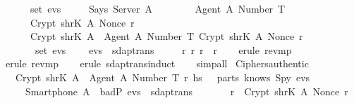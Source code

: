 \begin{isabellebody}
  \ \ \ \ {\isasymrbrace}\ {\isasymin}\ set\ evs\ {\isacharsemicolon}\isanewline
  \ \ \ \ Says\ Server\ A\ {\isasymlbrace}\ \isanewline
  \ \ \ \ \ \ {\isasymlbrace}Agent\ A{\isacharcomma}\ Number\ T{\isasymrbrace}{\isacharcomma}\isanewline
  \ \ \ \ \ \ Crypt\ {\isacharparenleft}shrK\ A{\isacharparenright}\ {\isacharparenleft}Nonce\ r{\isacharprime}{\isacharparenright}{\isacharcomma}\isanewline
  \ \ \ \ \ \ Crypt\ {\isacharparenleft}shrK\ A{\isacharparenright}\ {\isasymlbrace}\ {\isasymlbrace}Agent\ A{\isacharcomma}\ Number\ T{\isasymrbrace}{\isacharcomma}\ Crypt\ {\isacharparenleft}shrK\ A{\isacharparenright}\ {\isacharparenleft}Nonce\ r{\isacharprime}{\isacharparenright}\ {\isasymrbrace}\isanewline
  \ \ \ \ \ {\isasymrbrace}\ {\isasymin}\ set\ evs{\isacharsemicolon}\isanewline
  \ \ \ \ evs\ {\isasymin}\ sdaptrans{\isasymrbrakk}\isanewline
  \ \ \ {\isasymLongrightarrow}\ {\isasymexists}\ r\ r{\isacharprime}{\isachardot}\ {\isacharparenleft}r\ {\isacharequal}\ r{\isacharprime}{\isacharparenright}{\isachardoublequoteclose}\isanewline
  \isadelimproof
  \isanewline
  \ \ %
  \endisadelimproof
  \isatagproof
  \isamarkupfalse%
  \ {\isacharparenleft}erule\ rev{\isacharunderscore}mp{\isacharparenright}\isanewline
  \ \ \isamarkupfalse%
  \ {\isacharparenleft}erule\ rev{\isacharunderscore}mp{\isacharparenright}\isanewline
  \ \ \isamarkupfalse%
  \ {\isacharparenleft}erule\ sdaptrans{\isachardot}induct{\isacharparenright}\isanewline
  \ \ \isamarkupfalse%
  \ {\isacharparenleft}simp{\isacharunderscore}all{\isacharparenright}\isanewline
  \isamarkupfalse%
  \endisatagproof
  {\isafoldproof}%
  \isadelimproof
  \isanewline
  \endisadelimproof
  \isanewline
  \isanewline
  \isamarkupfalse%
  \ Ciphers{\isacharunderscore}authentic\ {\isacharcolon}\isanewline
  \ \ {\isachardoublequoteopen}{\isasymlbrakk}\ Crypt\ {\isacharparenleft}shrK\ A{\isacharparenright}\ {\isasymlbrace}\ {\isasymlbrace}Agent\ A{\isacharcomma}\ Number\ T{\isasymrbrace}{\isacharcomma}\ r{\isacharprime}{\isacharcomma}\ h\isactrlsub s\ {\isasymrbrace}\ {\isasymin}\ parts\ {\isacharparenleft}knows\ Spy\ evs{\isacharparenright}{\isacharsemicolon}\isanewline
  \ \ \ \ \ {\isacharparenleft}Smartphone\ A{\isacharparenright}\ {\isasymnotin}\ badP{\isacharsemicolon}\ evs\ {\isasymin}\ sdaptrans\ {\isasymrbrakk}\isanewline
  \ \ \ \ \ {\isasymLongrightarrow}\ r{\isacharprime}\ {\isacharequal}\ Crypt\ {\isacharparenleft}shrK\ A{\isacharparenright}\ {\isacharparenleft}Nonce\ r{\isacharparenright}\ {\isasymand}\isanewline

\end{isabellebody}
